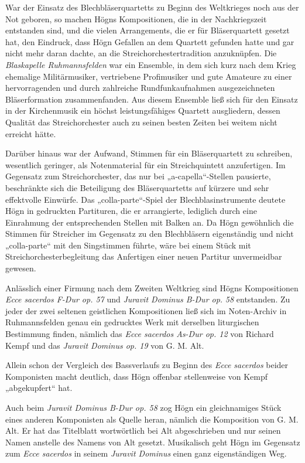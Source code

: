 \documentclass{book}
\begin{document}
War der Einsatz des Blechbläserquartetts zu Beginn des Weltkrieges noch
aus der Not geboren, so machen Högns Kompositionen, die in der
Nachkriegszeit entstanden sind, und die vielen Arrangements, die er
für Bläserquartett gesetzt hat, den Eindruck, dass Högn Gefallen an
dem Quartett gefunden hatte und gar nicht mehr daran dachte, an die
Streichorchestertradition anzuknüpfen. Die \textit{Blaskapelle
Ruhmannsfelden} war ein Ensemble, in dem sich kurz nach dem Krieg
ehemalige Militärmusiker, vertriebene Profimusiker und gute Amateure
zu einer hervorragenden und durch zahlreiche Rundfunkaufnahmen
ausgezeichneten Bläserformation zusammenfanden. Aus diesem Ensemble
ließ sich für den Einsatz in der Kirchenmusik ein höchst
leistungsfähiges Quartett ausgliedern, dessen Qualität das
Streichorchester auch zu seinen besten Zeiten bei weitem nicht erreicht
hätte.

Darüber hinaus war der Aufwand, Stimmen für ein Bläserquartett zu
schreiben, wesentlich geringer, als Notenmaterial für ein
Streichquintett anzufertigen. Im Gegensatz zum Streichorchester, das
nur bei „a-capella“-Stellen pausierte, beschränkte sich die Beteiligung
des Bläserquartetts auf kürzere und sehr effektvolle Einwürfe. Das
„colla-parte“-Spiel der Blechblasinstrumente deutete Högn in gedruckten
Partituren, die er arrangierte, lediglich durch eine Einrahmung der
entsprechenden Stellen mit Balken an. Da Högn gewöhnlich die Stimmen
für Streicher im Gegensatz zu den Blechbläsern eigenständig und nicht
„colla-parte“ mit den Singstimmen führte, wäre bei einem Stück mit
Streichorchesterbegleitung das Anfertigen einer neuen Partitur
unvermeidbar gewesen.

Anlässlich einer Firmung nach dem Zweiten Weltkrieg sind Högns
Kompositionen \textit{Ecce sacerdos F-Dur op. 57} und \textit{Juravit
Dominus B-Dur op.} \textit{58} entstanden. Zu jeder der zwei seltenen
geistlichen Kompositionen ließ sich im Noten-Archiv in Ruhmannsfelden
genau ein gedrucktes Werk mit derselben liturgischen Bestimmung finden,
nämlich das \textit{Ecce sacerdos As-Dur op. 12} von Richard Kempf und
das \textit{Juravit Dominus op. 19} von G. M. Alt.

Allein schon der Vergleich des Bassverlaufs zu Beginn des \textit{Ecce
sacerdos} beider Komponisten macht deutlich, dass Högn offenbar
stellenweise von Kempf „abgekupfert“ hat.

Auch beim \textit{Juravit Dominus B-Dur op. 58} zog Högn ein
gleichnamiges Stück eines anderen Komponisten als Quelle heran, nämlich
die Komposition von G. M. Alt. Er hat das Titelblatt wortwörtlich bei
Alt abgeschrieben und nur seinen Namen anstelle des Namens von Alt
gesetzt. Musikalisch geht Högn im Gegensatz zum \textit{Ecce sacerdos}
in seinem \textit{Juravit Dominus} einen ganz eigenständigen Weg.
\end{document}
